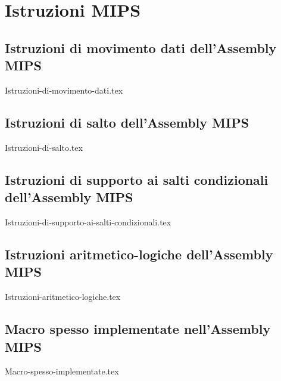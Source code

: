 \documentclass[class=book, crop=false]{standalone}
\begin{document}
\appendix
\chapter{Istruzioni MIPS}

\section*{Istruzioni di movimento dati dell'Assembly MIPS}
\begin{table}[H]
	\centering
	{Istruzioni-di-movimento-dati.tex}
\end{table}

\section*{Istruzioni di salto dell'Assembly MIPS}
\begin{table}[H]
	\centering
	{Istruzioni-di-salto.tex}
\end{table}

\section*{Istruzioni di supporto ai salti condizionali dell'Assembly MIPS}
\begin{table}[H]
	\centering
	{Istruzioni-di-supporto-ai-salti-condizionali.tex}
\end{table}

\section*{Istruzioni aritmetico-logiche dell'Assembly MIPS}
\begin{table}[H]
	\centering
	{Istruzioni-aritmetico-logiche.tex}
\end{table}

\section*{Macro spesso implementate nell'Assembly MIPS}
\begin{table}[H]
	\centering
	{Macro-spesso-implementate.tex}
\end{table}
\end{document}
